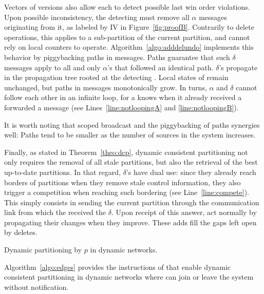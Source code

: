 Vectors of versions also allow each \process to detect possible last
win order violations. Upon possible inconsistency, the detecting
\process must remove all $\alpha$ messages originating from it, as
labeled by IV in Figure~\ref{fig:proofB}. Contrarily to delete
operations, this applies to a sub-partition of the current partition,
and cannot rely on local counters to
operate. Algorithm~\ref{algo:adddelundo} implements this behavior by
piggybacking paths in messages. Paths guarantee that such $\delta$
messages apply to all and only $\alpha$'s that followed an identical
path. $\delta$'s propagate in the propagation tree rooted at the
detecting \process. Local states of \processes remain unchanged, but
paths in messages monotonically grow. In turns, $\alpha$ and $\delta$
cannot follow each other in an infinite loop, for a \process knows when
it already received a forwarded a message (see
Lines~\ref{line:notloopingA} and \ref{line:notloopingB}).

\noindent It is worth noting that scoped broadcast and the
piggybacking of paths synergies well: Paths tend to be smaller as the
number of sources in the system increases.

Finally, as stated in Theorem~\ref{theo:dcp}, dynamic consistent
partitioning not only requires the removal of all stale partitions,
but also the retrieval of the best up-to-date partitions. In that
regard, $\delta$'s have dual use: since they already reach borders of
partitions when they remove stale control information, they also
trigger a competition when reaching such bordering \processes (see
Line~\ref{line:compete}). This simply consists in sending the current
partition through the communication link from which the \process
received the $\delta$. Upon receipt of this answer, \processes act
normally by propagating their changes when they improve. These adds
fill the gaps left open by deletes.

\begin{algorithm}
  
  \caption{\label{algo:edges}Dynamic partitioning by \Process $p$ in dynamic networks.}
\end{algorithm}

Algorithm~\ref{algo:edges} provides the instructions of \NAME that
enable dynamic consistent partitioning in dynamic networks where
\processes can join or leave the system without
notification. 



